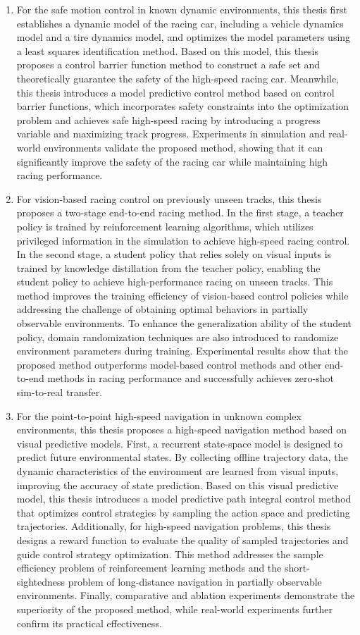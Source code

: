 \begin{enumerate}
    \item For the safe motion control in known dynamic environments, this thesis first establishes a dynamic model of the racing car, including a vehicle dynamics model and a tire dynamics model, and optimizes the model parameters using a least squares identification method. Based on this model, this thesis proposes a control barrier function method to construct a safe set and theoretically guarantee the safety of the high-speed racing car. Meanwhile, this thesis introduces a model predictive control method based on control barrier functions, which incorporates safety constraints into the optimization problem and achieves safe high-speed racing by introducing a progress variable and maximizing track progress. Experiments in simulation and real-world environments validate the proposed method, showing that it can significantly improve the safety of the racing car while maintaining high racing performance.
    \item For vision-based racing control on previously unseen tracks, this thesis proposes a two-stage end-to-end racing method. In the first stage, a teacher policy is trained by reinforcement learning algorithms, which utilizes privileged information in the simulation to achieve high-speed racing control. In the second stage, a student policy that relies solely on visual inputs is trained by knowledge distillation from the teacher policy, enabling the student policy to achieve high-performance racing on unseen tracks. This method improves the training efficiency of vision-based control policies while addressing the challenge of obtaining optimal behaviors in partially observable environments. To enhance the generalization ability of the student policy, domain randomization techniques are also introduced to randomize environment parameters during training. Experimental results show that the proposed method outperforms model-based control methods and other end-to-end methods in racing performance and successfully achieves zero-shot sim-to-real transfer.
    \item For the point-to-point high-speed navigation in unknown complex environments, this thesis proposes a high-speed navigation method based on visual predictive models. First, a recurrent state-space model is designed to predict future environmental states. By collecting offline trajectory data, the dynamic characteristics of the environment are learned from visual inputs, improving the accuracy of state prediction. Based on this visual predictive model, this thesis introduces a model predictive path integral control method that optimizes control strategies by sampling the action space and predicting trajectories. Additionally, for high-speed navigation problems, this thesis designs a reward function to evaluate the quality of sampled trajectories and guide control strategy optimization. This method addresses the sample efficiency problem of reinforcement learning methods and the short-sightedness problem of long-distance navigation in partially observable environments. Finally, comparative and ablation experiments demonstrate the superiority of the proposed method, while real-world experiments further confirm its practical effectiveness.


\end{enumerate}
